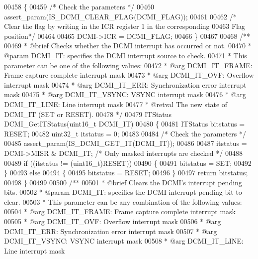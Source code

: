 \begin{DoxyCode}
00458 \{
00459   \textcolor{comment}{/* Check the parameters */}
00460   assert_param(IS\_DCMI\_CLEAR\_FLAG(DCMI\_FLAG));
00461 
00462   \textcolor{comment}{/* Clear the flag by writing in the ICR register 1 in the corresponding }
00463 \textcolor{comment}{  Flag position*/}
00464 
00465   DCMI->ICR = DCMI\_FLAG;
00466 \}
00467 
00468 \textcolor{comment}{/**}
00469 \textcolor{comment}{  * @brief  Checks whether the DCMI interrupt has occurred or not.}
00470 \textcolor{comment}{  * @param  DCMI\_IT: specifies the DCMI interrupt source to check.}
00471 \textcolor{comment}{  *          This parameter can be one of the following values:}
00472 \textcolor{comment}{  *            @arg DCMI\_IT\_FRAME: Frame capture complete interrupt mask}
00473 \textcolor{comment}{  *            @arg DCMI\_IT\_OVF: Overflow interrupt mask}
00474 \textcolor{comment}{  *            @arg DCMI\_IT\_ERR: Synchronization error interrupt mask}
00475 \textcolor{comment}{  *            @arg DCMI\_IT\_VSYNC: VSYNC interrupt mask}
00476 \textcolor{comment}{  *            @arg DCMI\_IT\_LINE: Line interrupt mask}
00477 \textcolor{comment}{  * @retval The new state of DCMI\_IT (SET or RESET).}
00478 \textcolor{comment}{  */}
00479 ITStatus DCMI_GetITStatus(uint16\_t DCMI\_IT)
00480 \{
00481   ITStatus bitstatus = RESET;
00482   uint32\_t itstatus = 0;
00483 
00484   \textcolor{comment}{/* Check the parameters */}
00485   assert_param(IS\_DCMI\_GET\_IT(DCMI\_IT));
00486 
00487   itstatus = DCMI->MISR & DCMI\_IT; \textcolor{comment}{/* Only masked interrupts are checked */}
00488 
00489   \textcolor{keywordflow}{if} ((itstatus != (uint16\_t)RESET))
00490   \{
00491     bitstatus = SET;
00492   \}
00493   \textcolor{keywordflow}{else}
00494   \{
00495     bitstatus = RESET;
00496   \}
00497   \textcolor{keywordflow}{return} bitstatus;
00498 \}
00499 
00500 \textcolor{comment}{/**}
00501 \textcolor{comment}{  * @brief  Clears the DCMI's interrupt pending bits.}
00502 \textcolor{comment}{  * @param  DCMI\_IT: specifies the DCMI interrupt pending bit to clear.}
00503 \textcolor{comment}{  *          This parameter can be any combination of the following values:}
00504 \textcolor{comment}{  *            @arg DCMI\_IT\_FRAME: Frame capture complete interrupt mask}
00505 \textcolor{comment}{  *            @arg DCMI\_IT\_OVF: Overflow interrupt mask}
00506 \textcolor{comment}{  *            @arg DCMI\_IT\_ERR: Synchronization error interrupt mask}
00507 \textcolor{comment}{  *            @arg DCMI\_IT\_VSYNC: VSYNC interrupt mask}
00508 \textcolor{comment}{  *            @arg DCMI\_IT\_LINE: Line interrupt mask}

\end{DoxyCode}
